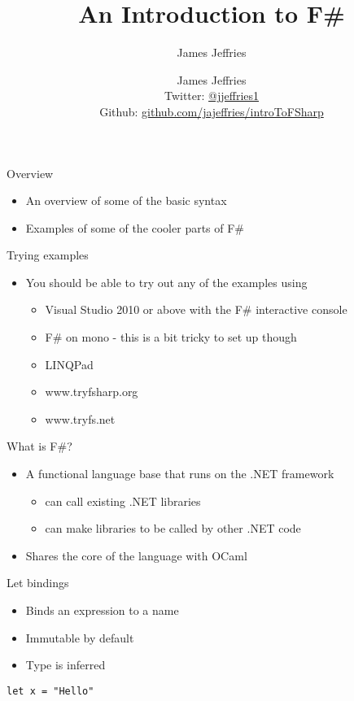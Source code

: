 \documentclass[landscape]{slides}
\author{James Jeffries}
\author{\parbox{.5\textwidth}{\centering
  James Jeffries \\
  \small Twitter: \href{http://www.twitter.com/jjeffries1}{@jjeffries1} \\[3pt]
  Github: \href{https://github.com/jajeffries/introToFSharp}{github.com/jajeffries/introToFSharp}}}
\title{An Introduction to F\#}
\begin{document}
\begin{slide}
\maketitle
\end{slide}

\begin{slide}{Overview}
\begin{itemize}
\item An overview of some of the basic syntax
\item Examples of some of the cooler parts of F\#
\end{itemize}
\end{slide}

\begin{slide}{Trying examples}
\begin{itemize}
\item You should be able to try out any of the examples using
\begin{itemize}
\item Visual Studio 2010 or above with the F\# interactive console
\item F\# on mono - this is a bit tricky to set up though
\item LINQPad
\item www.tryfsharp.org
\item www.tryfs.net
\end{itemize}
\end{itemize}
\end{slide}

\begin{slide}{What is F\#?}
\begin{itemize}
\item A functional language base that runs on the .NET framework
\begin{itemize}
\item can call existing .NET libraries
\item can make libraries to be called by other .NET code
\end{itemize}
\item Shares the core of the language with OCaml
\end{itemize}
\end{slide}

\begin{slide}{Let bindings}
\begin{itemize}
\item Binds an expression to a name
\item Immutable by default
\item Type is inferred
\end{itemize}
\begin{verbatim}
let x = "Hello"
\end{verbatim}
\end{slide}
\end{document}
